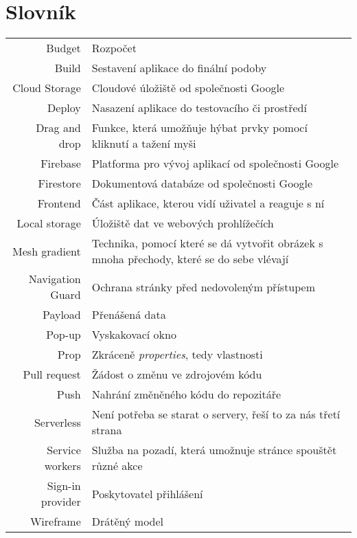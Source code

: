
\chapter{Slovník}

\begin{tabular}{rp{}}
    Budget              & Rozpočet \\
    Build               & Sestavení aplikace do finální podoby \\
    Cloud Storage       & Cloudové úložiště od společnosti Google \\
    Deploy              & Nasazení aplikace do testovacího či prostředí \\
    Drag and drop       & Funkce, která umožňuje hýbat prvky pomocí kliknutí a tažení myši \\
    Firebase            & Platforma pro vývoj aplikací od společnosti Google \\
    Firestore           & Dokumentová databáze od společnosti Google \\
    Frontend            & Část aplikace, kterou vidí uživatel a reaguje s ní \\
    Local storage       & Úložiště dat ve webových prohlížečích \\
    Mesh gradient       & Technika, pomocí které se dá vytvořit obrázek s mnoha přechody, které se do sebe vlévají \\
    Navigation Guard    & Ochrana stránky před nedovoleným přístupem \\
    Payload             & Přenášená data \\
    Pop-up              & Vyskakovací okno \\
    Prop                & Zkráceně \emph{properties}, tedy vlastnosti \\
    Pull request        & Žádost o změnu ve zdrojovém kódu \\
    Push                & Nahrání změněného kódu do repozitáře \\
    Serverless          & Není potřeba se starat o servery, řeší to za nás třetí strana \\
    Service workers     & Služba na pozadí, která umožnuje stránce spouštět různé akce \\
    Sign-in provider    & Poskytovatel přihlášení \\
    Wireframe           & Drátěný model \\
\end{tabular}
